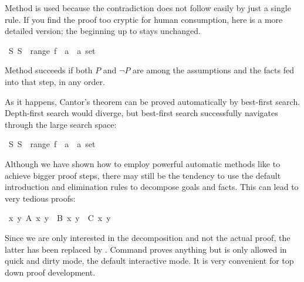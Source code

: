 \begin{isabellebody}
\begin{isamarkuptext}
Method  is used because the contradiction does not follow easily
by just a single rule. If you find the proof too cryptic for human
consumption, here is a more detailed version; the beginning up to
 stays unchanged.%
\end{isamarkuptext}%
\isamarkuptrue%
\ {\isachardoublequote}{\isasymexists}S{\isachardot}\ S\ {\isasymnotin}\ range\ {\isacharparenleft}f\ {\isacharcolon}{\isacharcolon}\ {\isacharprime}a\ {\isasymRightarrow}\ {\isacharprime}a\ set{\isacharparenright}{\isachardoublequote}\isanewline
\isamarkupfalse%
\isamarkupfalse%
\isamarkupfalse%
\isamarkupfalse%
\isamarkupfalse%
\isamarkupfalse%
\isamarkupfalse%
\isamarkupfalse%
\isamarkupfalse%
\isamarkupfalse%
\isamarkupfalse%
\isamarkupfalse%
\isamarkupfalse%
\isamarkupfalse%
\isamarkupfalse%
\isamarkupfalse%
\isamarkupfalse%
\isamarkupfalse%
\isamarkupfalse%
\isamarkupfalse%
\isamarkupfalse%
\isamarkupfalse%
\isamarkupfalse%
\isamarkupfalse%
\isamarkupfalse%
\isamarkupfalse%
\isamarkupfalse%
\isamarkupfalse%
\isamarkupfalse%
%
\begin{isamarkuptext}%
\noindent Method  succeeds if both $P$ and
$\neg P$ are among the assumptions and the facts fed into that step, in any order.

As it happens, Cantor's theorem can be proved automatically by best-first
search. Depth-first search would diverge, but best-first search successfully
navigates through the large search space:%
\end{isamarkuptext}%
\isamarkuptrue%
\ {\isachardoublequote}{\isasymexists}S{\isachardot}\ S\ {\isasymnotin}\ range\ {\isacharparenleft}f\ {\isacharcolon}{\isacharcolon}\ {\isacharprime}a\ {\isasymRightarrow}\ {\isacharprime}a\ set{\isacharparenright}{\isachardoublequote}\isanewline
\isamarkupfalse%
\isamarkupfalse%
%
\isamarkuptrue%
%
\begin{isamarkuptext}%
Although we have shown how to employ powerful automatic methods like
 to achieve bigger proof steps, there may still be the
tendency to use the default introduction and elimination rules to
decompose goals and facts. This can lead to very tedious proofs:%
\end{isamarkuptext}%
\isamarkuptrue%
\isamarkupfalse%
\ {\isachardoublequote}{\isasymforall}x\ y{\isachardot}\ A\ x\ y\ {\isasymand}\ B\ x\ y\ {\isasymlongrightarrow}\ C\ x\ y{\isachardoublequote}\isanewline
\isamarkupfalse%
\isamarkupfalse%
\isamarkupfalse%
\isamarkupfalse%
\isamarkupfalse%
\isamarkupfalse%
\isamarkupfalse%
\isamarkupfalse%
\isamarkupfalse%
\isamarkupfalse%
\isamarkupfalse%
\isamarkupfalse%
\isamarkupfalse%
\isamarkupfalse%
%
\begin{isamarkuptext}%
\noindent Since we are only interested in the decomposition and not the
actual proof, the latter has been replaced by
. Command  proves anything but is
only allowed in quick and dirty mode, the default interactive mode. It
is very convenient for top down proof development.


\end{isamarkuptext}
\end{isabellebody}
